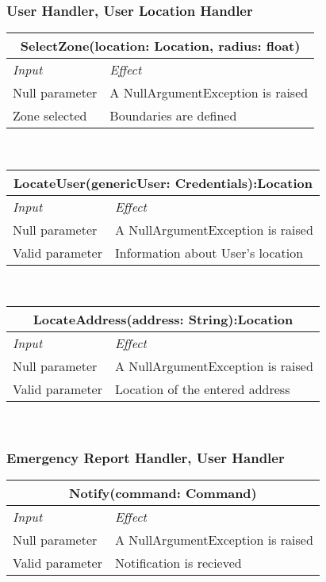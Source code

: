 			\subsubsection*{User Handler, User Location Handler}
			\begin{tabular}{ |l|l| }
				\hline
				\multicolumn{2}{|c|}{SelectZone(location: Location, radius: float)}\\
				\hline
				\textit{Input}&\textit{Effect}\\ \hline
				Null parameter & A NullArgumentException is raised\\ \hline
				Zone selected & Boundaries are defined \\ \hline
			\end{tabular}
			\\
			\begin{tabular}{ |l|l| }
				\hline
				\multicolumn{2}{|c|}{LocateUser(genericUser: Credentials):Location}\\
				\hline
				\textit{Input}&\textit{Effect}\\ \hline
				Null parameter & A NullArgumentException is raised\\ \hline
				Valid parameter  &  Information about User's location \\ \hline
			\end{tabular} 
			\\
			\begin{tabular}{ |l|l| } 
				\hline
				\multicolumn{2}{|c|}{LocateAddress(address: String):Location}\\
				\hline
				\textit{Input}&\textit{Effect}\\ \hline
				Null parameter & A NullArgumentException is raised\\ \hline
				Valid parameter  & Location of the entered address \\ \hline
			\end{tabular}
			\\
			\subsubsection*{Emergency Report Handler, User Handler}
			\begin{tabular}{ |l|l| }
				\hline
				\multicolumn{2}{|c|}{Notify(command: Command)}\\
				\hline
				\textit{Input}&\textit{Effect}\\ \hline
				Null parameter & A NullArgumentException is raised\\ \hline
				Valid parameter & Notification is recieved \\ \hline
			\end{tabular}
			\\			
			

